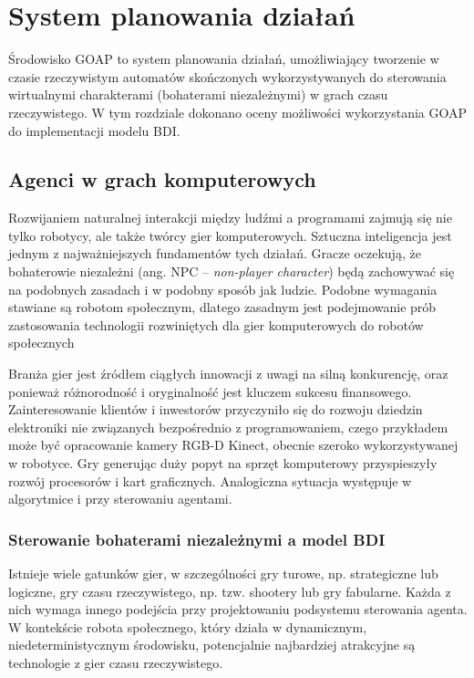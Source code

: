 \chapter{System planowania działań}
\label{chap:goap}

Środowisko GOAP to system planowania działań, umożliwiający tworzenie w czasie rzeczywistym automatów skończonych wykorzystywanych do sterowania wirtualnymi charakterami (bohaterami niezależnymi) w grach czasu rzeczywistego. W tym rozdziale dokonano oceny możliwości wykorzystania GOAP do implementacji modelu BDI.

\section{Agenci w grach komputerowych}
\label{sec:gry}

Rozwijaniem naturalnej interakcji między ludźmi a programami zajmują się nie tylko robotycy, ale także twórcy gier komputerowych. Sztuczna inteligencja jest jednym z najważniejszych fundamentów tych działań. Gracze oczekują, że bohaterowie niezależni (ang. NPC – \textit{non-player character}) będą zachowywać się na podobnych zasadach i w podobny sposób jak ludzie. Podobne wymagania stawiane są robotom społecznym, dlatego zasadnym jest podejmowanie prób zastosowania technologii rozwiniętych dla gier komputerowych do robotów społecznych

Branża gier jest źródłem ciągłych innowacji z uwagi na silną konkurencję, oraz ponieważ różnorodność i oryginalność jest kluczem sukcesu finansowego. Zainteresowanie klientów i inwestorów przyczyniło się do rozwoju dziedzin elektroniki nie związanych bezpośrednio z programowaniem, czego przykładem może być opracowanie kamery RGB-D Kinect, obecnie szeroko wykorzystywanej w robotyce. Gry generując duży popyt na sprzęt komputerowy przyspieszyły rozwój procesorów i kart graficznych. Analogiczna sytuacja występuje w algorytmice i przy sterowaniu agentami.

\subsection{Sterowanie bohaterami niezależnymi a model BDI}
\label{subsec:g_BDI}
Istnieje wiele gatunków gier, w szczególności gry turowe, np. strategiczne lub logiczne, gry czasu rzeczywistego, np. tzw. shootery lub gry fabularne. Każda z nich wymaga innego podejścia przy projektowaniu podsystemu sterowania agenta. W kontekście robota społecznego, który działa w dynamicznym, niedeterministycznym środowisku, potencjalnie najbardziej atrakcyjne są technologie z gier czasu rzeczywistego.

